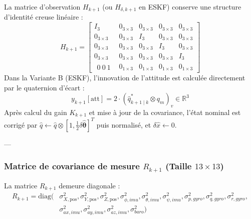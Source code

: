 \documentclass[../Formulations_Kalman.tex]{subfiles}
\begin{document}
La matrice d'observation $H_{k+1}$ (ou $H_{\delta, k+1}$ en ESKF) conserve une structure d'identité creuse linéaire :
\begin{equation}
H_{k+1} = \begin{bmatrix}
I_3 & 0_{3\times3} & 0_{3\times3} & 0_{3\times3} & 0_{3\times3} \\
0_{3\times3} & 0_{3\times3} & I_3 & 0_{3\times3} & 0_{3\times3} \\
0_{3\times3} & 0_{3\times3} & 0_{3\times3} & I_3 & 0_{3\times3} \\
0_{3\times3} & 0_{3\times3} & 0_{3\times3} & 0_{3\times3} & I_3 \\
\begin{matrix} 0\ 0\ 1 \end{matrix} & 0_{1\times3} & 0_{1\times3} & 0_{1\times3} & 0_{1\times3}
\end{bmatrix}
\end{equation}
Dans la Variante B (ESKF), l'innovation de l'attitude est calculée directement par le quaternion d'écart :
\begin{equation}
y_{k+1}[\text{att}] = 2 \cdot \left( \hat{q}_{k+1\mid k}^* \otimes q_m \right)_v \in \mathbb{R}^3
\end{equation}
Après calcul du gain $K_{k+1}$ et mise à jour de la covariance, l'état nominal est corrigé par $\hat{q} \leftarrow \hat{q} \otimes [1, \frac{1}{2}\delta\hat{\boldsymbol{\theta}}]^T$ puis normalisé, et $\delta\hat{x} \leftarrow 0$.

---

\subsubsection{Matrice de covariance de mesure $R_{k+1}$ (Taille $13 \times 13$)}
La matrice $R_{k+1}$ demeure diagonale :
\begin{equation}
\begin{split}
R_{k+1} = \text{diag}(&\sigma_{X,\text{pos}}^2, \sigma_{Y,\text{pos}}^2, \sigma_{Z,\text{pos}}^2, \sigma_{\phi,imu}^2, \sigma_{\theta,imu}^2, \sigma_{\psi,imu}^2, \sigma_{p,gyro}^2, \sigma_{q,gyro}^2, \sigma_{r,gyro}^2, \\
& \sigma_{ax,imu}^2, \sigma_{ay,imu}^2, \sigma_{az,imu}^2, \sigma_{baro}^2)
\end{split}
\end{equation}
\end{document}
